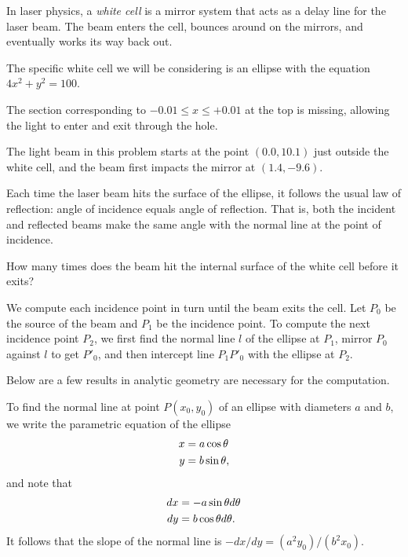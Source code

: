 




In laser physics, a \emph{white cell} is a mirror system that acts as a delay line for the laser beam. The beam enters the cell, bounces around on the mirrors, and eventually works its way back out.

The specific white cell we will be considering is an ellipse with the equation $4 x^2 + y^2 = 100$.

The section corresponding to $-0.01 \le x \le +0.01$ at the top is missing, allowing the light to enter and exit through the hole.

The light beam in this problem starts at the point $(0.0, 10.1)$ just outside the white cell, and the beam first impacts the mirror at $(1.4, -9.6)$.

Each time the laser beam hits the surface of the ellipse, it follows the usual law of reflection: angle of incidence equals angle of reflection. That is, both the incident and reflected beams make the same angle with the normal line at the point of incidence.

How many times does the beam hit the internal surface of the white cell before it exits?

\solution

We compute each incidence point in turn until the beam exits the cell. Let $P_0$ be the source of the beam and $P_1$ be the incidence point. To compute the next incidence point $P_2$, we first find the normal line $l$ of the ellipse at $P_1$, mirror $P_0$ against $l$ to get $P'_0$, and then intercept line $P_1 P'_0$ with the ellipse at $P_2$.

Below are a few results in analytic geometry are necessary for the computation.

To find the normal line at point $P(x_0,y_0)$ of an ellipse with diameters $a$ and $b$, we write the parametric equation of the ellipse
\begin{align}
x &= a \cos \theta \notag \\
y &= b \sin \theta , \notag
\end{align}
and note that
\begin{align}
dx &= -a \sin \theta d\theta \notag \\
dy &= b \cos \theta d\theta . \notag
\end{align}
It follows that the slope of the normal line is $-dx/dy = (a^2 y_0) / (b^2 x_0)$.

